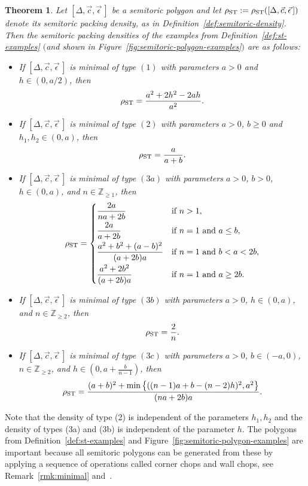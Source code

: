 \documentclass[pdftex]{sigma}
\numberwithin{equation}{section}
\newtheorem{Theorem}{Theorem}[section]
\def\Z{{\mathbb Z}}
\newcommand{\De}{\Delta}
\newcommand{\stpoly}{[\De,\vec{c},\vec{\epsilon}\,]}
\begin{document}
\begin{Theorem}\label{thm:semitoric-examples}
 Let $\stpoly$ be a semitoric polygon and let $\rho_{{\rm ST}}:=\rho_{{\rm ST}}(\stpoly)$ denote its semitoric packing density, as in Definition~{\rm \ref{def:semitoric-density}}.
 Then the semitoric packing densities of the examples from Definition~{\rm \ref{def:st-examples}} $($and shown in Figure~{\rm \ref{fig:semitoric-polygon-examples}}$)$ are as follows:
 \begin{itemize}\itemsep=0pt
 \item If $\stpoly$ is minimal of type $(1)$ with parameters $a>0$ and $h\in(0, a/2)$, then
 \[
 \rho_{{\rm ST}} = \frac{a^2+2h^2-2ah}{a^2}.
 \]
 \item If $\stpoly$ is minimal of type $(2)$ with parameters $a>0$, $b\geq 0$ and $h_1,h_2\in(0,a)$, then
 \[
 \rho_{{\rm ST}} = \frac{a}{a+b}.
 \]
 \item If $\stpoly$ is minimal of type $(3a)$ with parameters $a>0$, $b>0$, $h\in(0, a)$, and $n\in\Z_{\geq 1}$, then
 \begin{equation*}
 \rho_{{\rm ST}} = \begin{cases}
 \dfrac{2a}{na+2b} & \text{if }n>1,\vspace{1mm}\\
 \dfrac{2a}{a+2b} & \text{if }n=1 \text{ and }a\leq b,\vspace{1mm}\\
 \dfrac{a^2+b^2+ (a-b)^2}{(a+2b)a} & \text{if }n=1 \text{ and } b < a < 2b,\vspace{1mm}\\
 \dfrac{a^2+2b^2}{(a+2b)a} & \text{if }n=1 \text{ and } a \geq 2b. \end{cases}
 \end{equation*}
 \item If $\stpoly$ is minimal of type $(3b)$ with parameters $a>0$, $h \in (0,a)$, and $n\in\Z_{\geq 2}$, then
 \[
 \rho_{{\rm ST}} = \frac{2}{n}.
 \]
 \item If $\stpoly$ is minimal of type $(3c)$ with parameters $a>0$, $b\in (-a,0)$, $n\in\Z_{\geq 2}$, and $h\in (0,a+\frac{b}{n-1})$, then
 \[
 \rho_{{\rm ST}} = \frac{(a+b)^2+\min\big\{ ((n-1)a+b - (n-2)h )^2,a^2\big\}}{(na+2b)a}.
 \]
 \end{itemize}
\end{Theorem}

Note that the density of type (2) is independent of the parameters $h_1,h_2$ and the density of types (3a) and (3b) is independent of the parameter $h$.
The polygons from Definition~\ref{def:st-examples} and Figure~\ref{fig:semitoric-polygon-examples} are important because all semitoric polygons can be generated from these by applying a sequence of operations called corner chops and wall chops, see Remark~\ref{rmk:minimal} and~\cite{LFP-fam2}.
\end{document}
